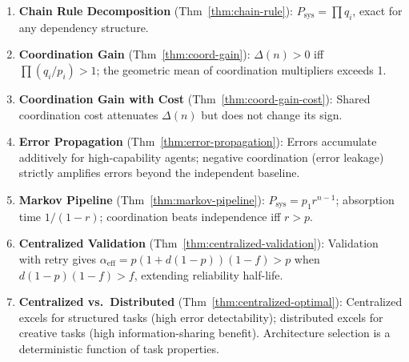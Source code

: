 \begin{enumerate}
  \item \textbf{Chain Rule Decomposition} (Thm~\ref{thm:chain-rule}):
    $P_{\mathrm{sys}} = \prod q_i$, exact for any dependency structure.

  \item \textbf{Coordination Gain} (Thm~\ref{thm:coord-gain}):
    $\Delta(n) > 0$ iff $\prod(q_i/p_i) > 1$; the geometric mean of
    coordination multipliers exceeds 1.

  \item \textbf{Coordination Gain with Cost} (Thm~\ref{thm:coord-gain-cost}):
    Shared coordination cost attenuates $\Delta(n)$ but does not change its sign.

  \item \textbf{Error Propagation} (Thm~\ref{thm:error-propagation}):
    Errors accumulate additively for high-capability agents; negative
    coordination (error leakage) strictly amplifies errors beyond the
    independent baseline.

  \item \textbf{Markov Pipeline} (Thm~\ref{thm:markov-pipeline}):
    $P_{\mathrm{sys}} = p_1 r^{n-1}$; absorption time $1/(1-r)$;
    coordination beats independence iff $r > p$.

  \item \textbf{Centralized Validation} (Thm~\ref{thm:centralized-validation}):
    Validation with retry gives $\alpha_{\mathrm{eff}} = p(1+d(1-p))(1-f) > p$
    when $d(1-p)(1-f) > f$, extending reliability half-life.

  \item \textbf{Centralized vs.\ Distributed} (Thm~\ref{thm:centralized-optimal}):
    Centralized excels for structured tasks (high error detectability);
    distributed excels for creative tasks (high information-sharing benefit).
    Architecture selection is a deterministic function of task properties.
\end{enumerate}
